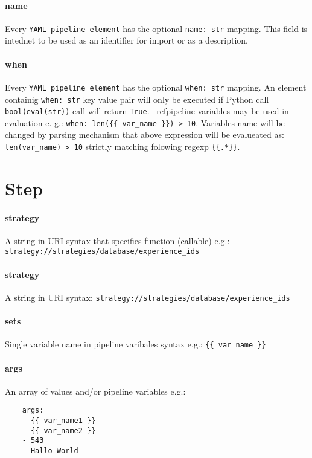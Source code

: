\documentclass[11pt]{article}
\begin{document}
\paragraph{name}Every \verb|YAML pipeline element| has the optional \verb|name: str| mapping. This field is intednet to be used as an identifier for import or as a description.

\paragraph{when}
Every \verb|YAML pipeline element| has the optional \verb|when: str| mapping. An element containig \verb|when: str| key value pair will only be executed if Python call \verb|bool(eval(str))| call will return \verb|True|. ~ref{pipeline variables} may be used in evaluation e. g.: \verb|when: len({{ var_name }}) > 10|. Variables name will be changed by parsing mechanism that above expression will be evalueated as: \verb|len(var_name) > 10| strictly matching folowing regexp \verb|{{.*}}|.

\section{Step}\label{step_info}
\paragraph{strategy}
A string in URI syntax that specifies function (callable) e.g.: \verb|strategy://strategies/database/experience_ids|

\paragraph{strategy}
A string in URI syntax: \verb|strategy://strategies/database/experience_ids|

\paragraph{sets}
Single variable name in pipeline varibales syntax e.g.: \verb|{{ var_name }}|

\paragraph{args}
An array of values and/or pipeline variables e.g.: 
\begin{verbatim}
	args:
	- {{ var_name1 }}
	- {{ var_name2 }}
	- 543
	- Hallo World 
\end{verbatim}
\end{document}

